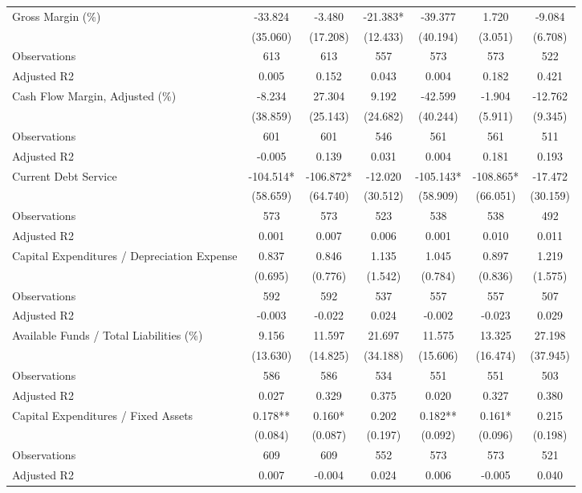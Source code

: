 \begin{table}[!htbp]
{\begin{tabular}{lcccccc}
Gross Margin (\%) & -33.824 & -3.480 & -21.383* & -39.377 & 1.720 & -9.084 \\
 & (35.060) & (17.208) & (12.433) & (40.194) & (3.051) & (6.708) \\
\quad Observations & 613 & 613 & 557 & 573 & 573 & 522 \\
\quad Adjusted R2 & 0.005 & 0.152 & 0.043 & 0.004 & 0.182 & 0.421 \\
Cash Flow Margin, Adjusted (\%) & -8.234 & 27.304 & 9.192 & -42.599 & -1.904 & -12.762 \\
 & (38.859) & (25.143) & (24.682) & (40.244) & (5.911) & (9.345) \\
\quad Observations & 601 & 601 & 546 & 561 & 561 & 511 \\
\quad Adjusted R2 & -0.005 & 0.139 & 0.031 & 0.004 & 0.181 & 0.193 \\
Current Debt Service & -104.514* & -106.872* & -12.020 & -105.143* & -108.865* & -17.472 \\
 & (58.659) & (64.740) & (30.512) & (58.909) & (66.051) & (30.159) \\
\quad Observations & 573 & 573 & 523 & 538 & 538 & 492 \\
\quad Adjusted R2 & 0.001 & 0.007 & 0.006 & 0.001 & 0.010 & 0.011 \\
Capital Expenditures / Depreciation Expense & 0.837 & 0.846 & 1.135 & 1.045 & 0.897 & 1.219 \\
 & (0.695) & (0.776) & (1.542) & (0.784) & (0.836) & (1.575) \\
\quad Observations & 592 & 592 & 537 & 557 & 557 & 507 \\
\quad Adjusted R2 & -0.003 & -0.022 & 0.024 & -0.002 & -0.023 & 0.029 \\
Available Funds / Total Liabilities (\%) & 9.156 & 11.597 & 21.697 & 11.575 & 13.325 & 27.198 \\
 & (13.630) & (14.825) & (34.188) & (15.606) & (16.474) & (37.945) \\
\quad Observations & 586 & 586 & 534 & 551 & 551 & 503 \\
\quad Adjusted R2 & 0.027 & 0.329 & 0.375 & 0.020 & 0.327 & 0.380 \\
Capital Expenditures / Fixed Assets & 0.178** & 0.160* & 0.202 & 0.182** & 0.161* & 0.215 \\
 & (0.084) & (0.087) & (0.197) & (0.092) & (0.096) & (0.198) \\
\quad Observations & 609 & 609 & 552 & 573 & 573 & 521 \\
\quad Adjusted R2 & 0.007 & -0.004 & 0.024 & 0.006 & -0.005 & 0.040 \\

\end{tabular}}
\end{table}
